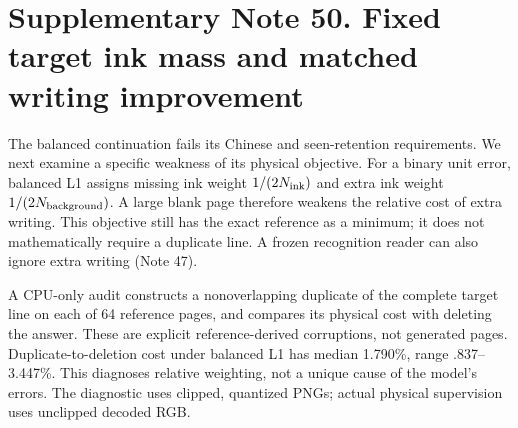\documentclass[10pt,a4paper]{article}
\begin{document}
\clearpage
{}

\clearpage
\section*{Supplementary Note 50. Fixed target ink mass and matched writing improvement}

The balanced continuation fails its Chinese and seen-retention requirements.
We next examine a specific weakness of its physical objective. For a binary
unit error, balanced L1 assigns missing ink weight $1/(2N_{\rm ink})$ and extra
ink weight $1/(2N_{\rm background})$. A large blank page therefore weakens the
relative cost of extra writing. This objective still has the exact reference
as a minimum; it does not mathematically require a duplicate line. A frozen
recognition reader can also ignore extra writing (Note 47).

A CPU-only audit constructs a nonoverlapping duplicate of the complete target
line on each of 64 reference pages, and compares its physical cost with deleting
the answer. These are explicit reference-derived corruptions, not generated
pages. Duplicate-to-deletion cost under balanced L1 has median 1.790\%, range
.837--3.447\%. This diagnoses relative weighting, not a unique cause of the
model's errors. The diagnostic uses clipped, quantized PNGs; actual physical
supervision uses unclipped decoded RGB.
\end{document}
